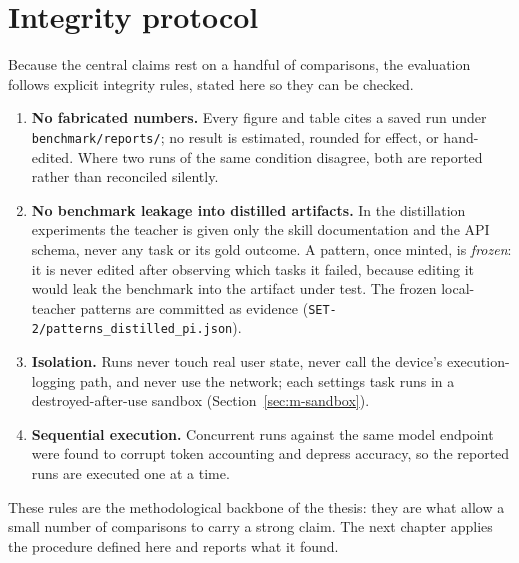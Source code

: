 \section{Integrity protocol}
\label{sec:m-integrity}

Because the central claims rest on a handful of comparisons, the evaluation
follows explicit integrity rules, stated here so they can be checked.

\begin{enumerate}[leftmargin=2em]
  \item \textbf{No fabricated numbers.} Every figure and table cites a saved run
    under \texttt{benchmark/reports/}; no result is estimated, rounded for
    effect, or hand-edited. Where two runs of the same condition disagree, both
    are reported rather than reconciled silently.
  \item \textbf{No benchmark leakage into distilled artifacts.} In the
    distillation experiments the teacher is given only the skill documentation
    and the API schema, never any task or its gold outcome. A pattern, once
    minted, is \emph{frozen}: it is never edited after observing which tasks it
    failed, because editing it would leak the benchmark into the artifact under
    test. The frozen local-teacher patterns are committed as evidence
    (\texttt{SET-2/patterns\_distilled\_pi.json}).
  \item \textbf{Isolation.} Runs never touch real user state, never call the
    device's execution-logging path, and never use the network; each settings
    task runs in a destroyed-after-use sandbox (Section~\ref{sec:m-sandbox}).
  \item \textbf{Sequential execution.} Concurrent runs against the same model
    endpoint were found to corrupt token accounting and depress accuracy, so the
    reported runs are executed one at a time.
\end{enumerate}

These rules are the methodological backbone of the thesis: they are what allow a
small number of comparisons to carry a strong claim. The next chapter applies the
procedure defined here and reports what it found.
